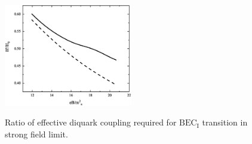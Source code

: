 \documentclass[prd, showpacs,nofootinbib,amsmath,amssymb,12pt]{revtex4}
\begin{document}
\begin{figure}[h]
  \caption{ Ratio of effective diquark coupling required for $\text{BEC}_\text{I}$ transition in strong field limit. }
  \centering
    \includegraphics[width=0.5\textwidth]{h.eps}
    \label{fig:h}
\end{figure}
\end{document}
